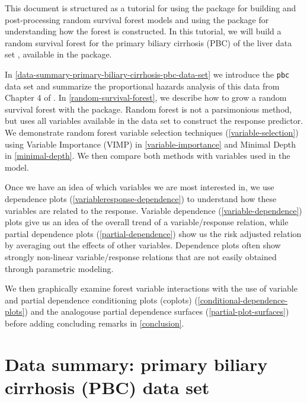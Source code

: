 \documentclass[article, nojss]{jss}
\begin{document}
This document is structured as a tutorial for using the
 package for building and post-processing random
survival forest models and using the  package for
understanding how the forest is constructed. In this tutorial, we will
build a random survival forest for the primary biliary cirrhosis (PBC)
of the liver data set \citep{fleming:1991}, available in the
 package.

In \autoref{data-summary-primary-biliary-cirrhosis-pbc-data-set} we
introduce the \texttt{pbc} data set and summarize the proportional
hazards analysis of this data from Chapter 4 of \citep{fleming:1991}. In
\autoref{random-survival-forest}, we describe how to grow a random
survival forest with the  package. Random forest is
not a parsimonious method, but uses all variables available in the data
set to construct the response predictor. We demonstrate random forest
variable selection techniques (\autoref{variable-selection}) using
Variable Importance (VIMP) \citep{Breiman:2001} in
\autoref{variable-importance} and Minimal Depth \citep{Ishwaran:2010} in
\autoref{minimal-depth}. We then compare both methods with variables
used in the \citep{fleming:1991} model.

Once we have an idea of which variables we are most interested in, we
use dependence plots \citep{Friedman:2000}
(\autoref{variableresponse-dependence}) to understand how these
variables are related to the response. Variable dependence
(\autoref{variable-dependence}) plots give us an idea of the overall
trend of a variable/response relation, while partial dependence plots
(\autoref{partial-dependence}) show us the risk adjusted relation by
averaging out the effects of other variables. Dependence plots often
show strongly non-linear variable/response relations that are not easily
obtained through parametric modeling.

We then graphically examine forest variable interactions with the use of
variable and partial dependence conditioning plots (coplots)
\citep{chambers:1992, cleveland:1993}
(\autoref{conditional-dependence-plots}) and the analogouse partial
dependence surfaces (\autoref{partial-plot-surfaces}) before adding
concluding remarks in \autoref{conclusion}.

\section{Data summary: primary biliary cirrhosis (PBC) data
set}\label{data-summary-primary-biliary-cirrhosis-pbc-data-set}
\end{document}
